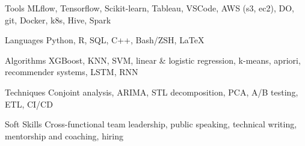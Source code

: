 

\begin{cvskills}

  \cvskill
    {Tools} %
    {MLflow, Tensorflow, Scikit-learn, Tableau, VSCode, AWS (s3, ec2), DO, git, Docker, k8s, Hive, Spark} %

  \cvskill
    {Languages} %
    {Python, R, SQL, C++, Bash/ZSH, {\LaTeX{}}} %

  \cvskill
    {Algorithms} %
    {XGBoost, KNN, SVM, linear \& logistic regression, k-means, apriori, recommender systems, LSTM, RNN} %

  \cvskill
    {Techniques} %
    {Conjoint analysis, ARIMA, STL decomposition, PCA, A/B testing, ETL, CI/CD} %

  \cvskill
    {Soft Skills} %
    {Cross-functional team leadership, public speaking, technical writing, mentorship and coaching, hiring} %

\end{cvskills}
